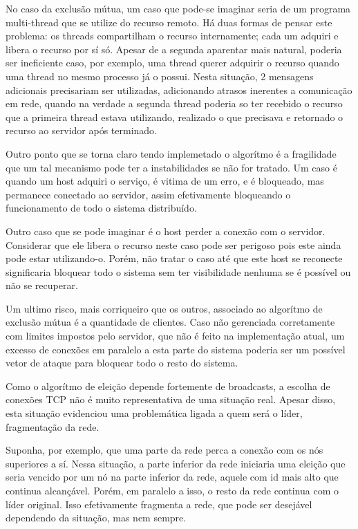 \documentclass{article}
\begin{document}
No caso da exclusão mútua, um caso que pode-se imaginar seria de um programa
multi-thread que se utilize do recurso remoto. Há duas formas de pensar este
problema: os threads compartilham o recurso internamente; cada um adquiri e
libera o recurso por sí só. Apesar de a segunda aparentar mais natural, poderia
ser ineficiente caso, por exemplo, uma thread querer adquirir o recurso quando
uma thread no mesmo processo já o possui. Nesta situação, 2 mensagens adicionais
precisariam ser utilizadas, adicionando atrasos inerentes a comunicação em rede,
quando na verdade a segunda thread poderia so ter recebido o recurso que a
primeira thread estava utilizando, realizado o que precisava e retornado o
recurso ao servidor após terminado. 

Outro ponto que se torna claro tendo implemetado o algorítmo é a fragilidade que
um tal mecanismo pode ter a instabilidades se não for tratado. Um caso é quando
um host adquiri o serviço, é vitima de um erro, e é bloqueado, mas permanece
conectado ao servidor, assim efetivamente bloqueando o funcionamento de todo o
sistema distribuído.

Outro caso que se pode imaginar é o host perder a conexão com o servidor.
Considerar que ele libera o recurso neste caso pode ser perigoso pois este ainda
pode estar utilizando-o. Porém, não tratar o caso até que este host se reconecte
significaria bloquear todo o sistema sem ter visibilidade nenhuma se é possível
ou não se recuperar.

Um ultimo risco, mais corriqueiro que os outros, associado ao algorítmo de
exclusão mútua é a quantidade de clientes. Caso não gerenciada corretamente com
limites impostos pelo servidor, que não é feito na implementação atual, um
excesso de conexões em paralelo a esta parte do sistema poderia ser um possível
vetor de ataque para bloquear todo o resto do sistema.

Como o algorítmo de eleição depende fortemente de broadcasts, a escolha de
conexões TCP não é muito representativa de uma situação real. Apesar disso, esta
situação evidenciou uma problemática ligada a quem será o líder, fragmentação da
rede.

Suponha, por exemplo, que uma parte da rede perca a conexão com os nós
superiores a sí. Nessa situação, a parte inferior da rede iniciaria uma eleição
que seria vencido por um nó na parte inferior da rede, aquele com id mais alto
que continua alcançável. Porém, em paralelo a isso, o resto da rede continua com
o líder original. Isso efetivamente fragmenta a rede, que pode ser desejável
dependendo da situação, mas nem sempre.
\end{document}
